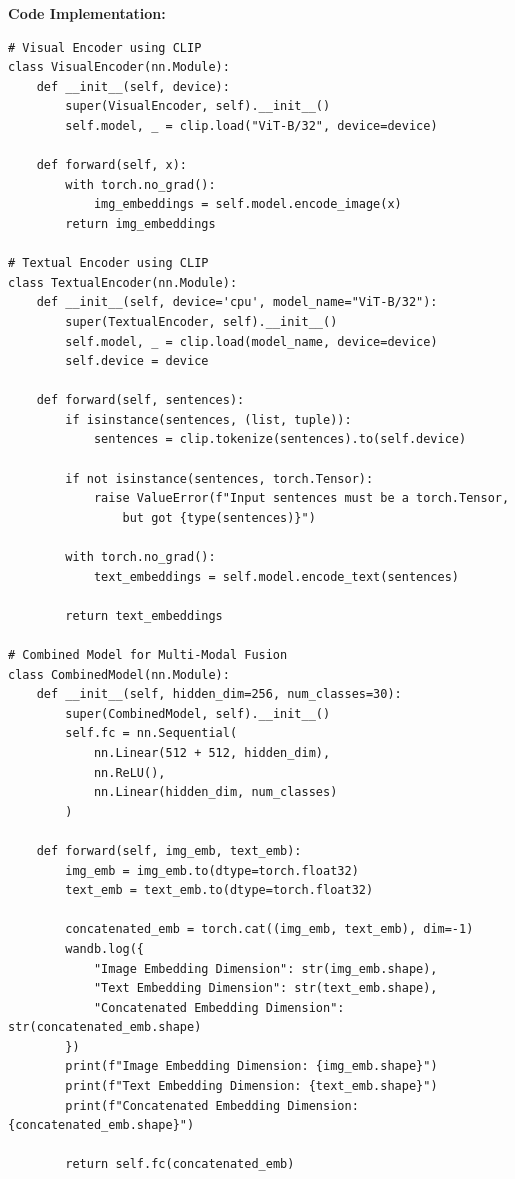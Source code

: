 \documentclass[11pt, oneside]{article}   	%
\begin{document}
\textbf{Code Implementation: } 
\\
\begin{verbatim}
# Visual Encoder using CLIP
class VisualEncoder(nn.Module):
    def __init__(self, device):
        super(VisualEncoder, self).__init__()
        self.model, _ = clip.load("ViT-B/32", device=device)

    def forward(self, x):
        with torch.no_grad():
            img_embeddings = self.model.encode_image(x)
        return img_embeddings

# Textual Encoder using CLIP
class TextualEncoder(nn.Module):
    def __init__(self, device='cpu', model_name="ViT-B/32"):
        super(TextualEncoder, self).__init__()
        self.model, _ = clip.load(model_name, device=device)
        self.device = device

    def forward(self, sentences):
        if isinstance(sentences, (list, tuple)):
            sentences = clip.tokenize(sentences).to(self.device)

        if not isinstance(sentences, torch.Tensor):
            raise ValueError(f"Input sentences must be a torch.Tensor, 
                but got {type(sentences)}")

        with torch.no_grad():
            text_embeddings = self.model.encode_text(sentences)

        return text_embeddings

# Combined Model for Multi-Modal Fusion
class CombinedModel(nn.Module):
    def __init__(self, hidden_dim=256, num_classes=30):
        super(CombinedModel, self).__init__()
        self.fc = nn.Sequential(
            nn.Linear(512 + 512, hidden_dim),
            nn.ReLU(),
            nn.Linear(hidden_dim, num_classes)
        )

    def forward(self, img_emb, text_emb):
        img_emb = img_emb.to(dtype=torch.float32)
        text_emb = text_emb.to(dtype=torch.float32)

        concatenated_emb = torch.cat((img_emb, text_emb), dim=-1)
        wandb.log({
            "Image Embedding Dimension": str(img_emb.shape),
            "Text Embedding Dimension": str(text_emb.shape),
            "Concatenated Embedding Dimension": str(concatenated_emb.shape)
        })
        print(f"Image Embedding Dimension: {img_emb.shape}")
        print(f"Text Embedding Dimension: {text_emb.shape}")
        print(f"Concatenated Embedding Dimension: {concatenated_emb.shape}")

        return self.fc(concatenated_emb)
\end{verbatim}
\end{document}
